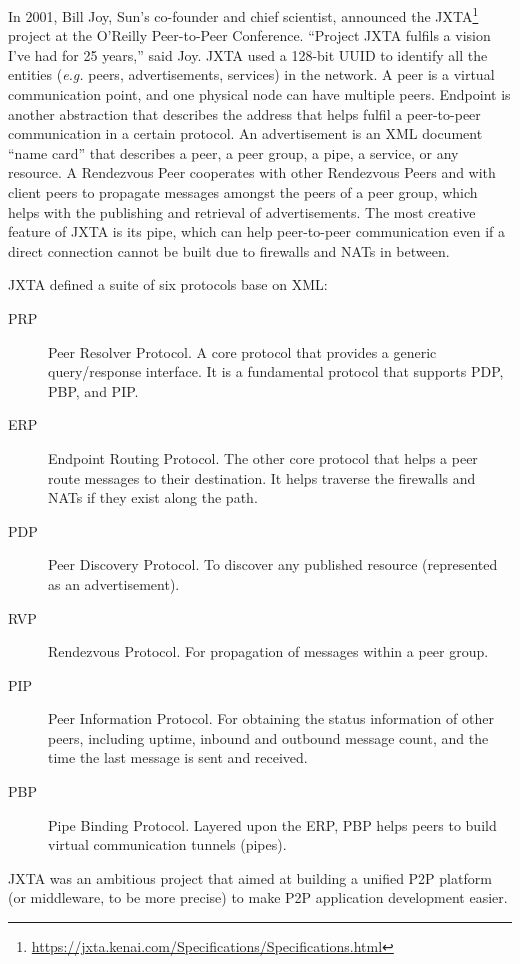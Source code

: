 In 2001, Bill Joy, Sun's co-founder and chief scientist, announced the JXTA\footnote{\url{https://jxta.kenai.com/Specifications/Specifications.html}} project at the O'Reilly Peer-to-Peer Conference. ``Project JXTA fulfils a vision I've had for 25 years,'' said Joy. 
JXTA used a 128-bit UUID to identify all the entities ({\em e.g.} peers, advertisements, services) in the network. A peer is a virtual communication point, and one physical node can have multiple peers. Endpoint is another abstraction that describes the address that helps fulfil a peer-to-peer communication in a certain protocol. An advertisement is an XML document ``name card'' that describes a peer, a peer group, a pipe, a service, or any resource. A Rendezvous Peer cooperates with other Rendezvous Peers and with client peers to propagate messages amongst the peers of a peer group, which helps with the publishing and retrieval of advertisements. The most creative feature of JXTA is its pipe, which can help peer-to-peer communication even if a direct connection cannot be built due to firewalls and NATs in between. 

JXTA defined a suite of six protocols base on XML: 
\begin{description}
	\item[PRP] Peer Resolver Protocol. A core protocol that provides a generic query/response interface. It is a fundamental protocol that supports PDP, PBP, and PIP. 
	\item[ERP] Endpoint Routing Protocol. The other core protocol that helps a peer route messages to their destination. It helps traverse the firewalls and NATs if they exist along the path. 
	\item[PDP] Peer Discovery Protocol. To discover any published resource (represented as an advertisement).  
	\item[RVP] Rendezvous Protocol. For propagation of messages within a peer group.  
	\item[PIP] Peer Information Protocol. For obtaining the status information of other peers, including uptime, inbound and outbound message count, and the time the last message is sent and received. 
	\item[PBP] Pipe Binding Protocol. Layered upon the ERP, PBP helps peers to build virtual communication tunnels (pipes).  
\end{description}

JXTA was an ambitious project that aimed at building a unified P2P platform (or middleware, to be more precise) to make P2P application development easier. 

